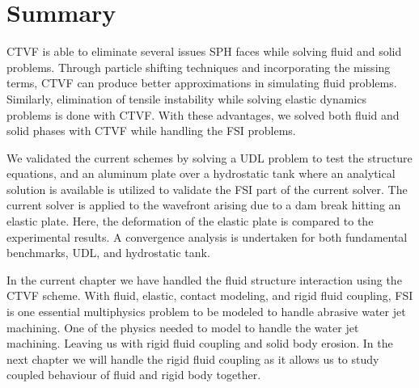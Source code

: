 \section{Summary}\label{fsi:summary}
CTVF is able to eliminate several issues SPH faces while solving fluid and solid
problems. Through particle shifting techniques and incorporating the missing
terms, CTVF can produce better approximations in simulating fluid problems.
Similarly, elimination of tensile instability while solving elastic dynamics
problems is done with CTVF. With these advantages, we solved both fluid and
solid phases with CTVF while handling the FSI problems.

We validated the current schemes by solving a UDL problem to test the structure
equations, and an aluminum plate over a hydrostatic tank where an analytical
solution is available is utilized to validate the FSI part of the current
solver. The current solver is applied to the wavefront arising due to a dam
break hitting an elastic plate. Here, the deformation of the elastic plate
is compared to the experimental results. A convergence analysis is undertaken
for both fundamental benchmarks, UDL, and hydrostatic tank.

In the current chapter we have handled the fluid structure interaction using the
CTVF scheme. With fluid, elastic, contact modeling, and rigid fluid coupling,
FSI is one essential multiphysics problem to be modeled to handle abrasive water
jet machining. One of the physics needed to model to handle the water jet
machining. Leaving us with rigid fluid coupling and solid body erosion. In the
next chapter we will handle the rigid fluid coupling as it allows us to study
coupled behaviour of fluid and rigid body together.
